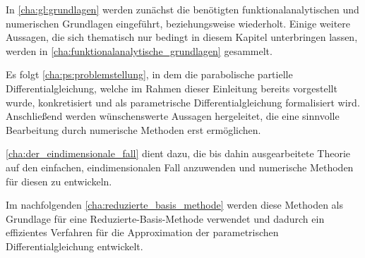 In \cref{cha:gl:grundlagen} werden zunächst die benötigten funktionalanalytischen und numerischen Grundlagen eingeführt, beziehungsweise wiederholt.
Einige weitere Aussagen, die sich thematisch nur bedingt in diesem Kapitel unterbringen lassen, werden in \cref{cha:funktionalanalytische_grundlagen} gesammelt.

Es folgt \cref{cha:ps:problemstellung}, in dem die parabolische partielle Differentialgleichung, welche im Rahmen dieser Einleitung bereits vorgestellt wurde, konkretisiert und als parametrische Differentialgleichung formalisiert wird.
Anschließend werden wünschenswerte Aussagen hergeleitet, die eine sinnvolle Bearbeitung durch numerische Methoden erst ermöglichen.

\cref{cha:der_eindimensionale_fall} dient dazu, die bis dahin ausgearbeitete Theorie auf den einfachen, eindimensionalen Fall anzuwenden und numerische Methoden für diesen zu entwickeln.

Im nachfolgenden \cref{cha:reduzierte_basis_methode} werden diese Methoden als Grundlage für eine Reduzierte-Basis-Methode verwendet und dadurch ein effizientes Verfahren für die Approximation der parametrischen Differentialgleichung entwickelt.


